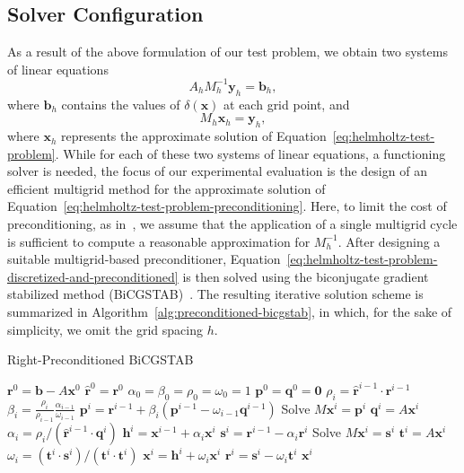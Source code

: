 \subsection{Solver Configuration}
\label{sec:solver-configuration-helmholtz}
As a result of the above formulation of our test problem, we obtain two systems of linear equations
\begin{equation}
	A_h M_h^{-1} \bm{y}_h = \bm{b}_h,
	\label{eq:helmholtz-test-problem-discretized-and-preconditioned}
\end{equation}
where $\bm{b}_h$ contains the values of $\delta(\bm{x})$ at each grid point, and
\begin{equation}
	M_h \bm{x}_h = \bm{y}_h,
	\label{eq:helmholtz-test-problem-preconditioning}
\end{equation}
where $\bm{x}_h$ represents the approximate solution of Equation~\eqref{eq:helmholtz-test-problem}.
While for each of these two systems of linear equations, a functioning solver is needed, the focus of our experimental evaluation is the design of an efficient multigrid method for the approximate solution of Equation~\eqref{eq:helmholtz-test-problem-preconditioning}.
Here, to limit the cost of preconditioning, as in~\cite{erlangga2008advances}, we assume that the application of a single multigrid cycle is sufficient to compute a reasonable approximation for $M_{h}^{-1}$.
After designing a suitable multigrid-based preconditioner, Equation~\eqref{eq:helmholtz-test-problem-discretized-and-preconditioned} is then solved using the biconjugate gradient stabilized method (BiCGSTAB)~\cite{saad2003iterative}.
The resulting iterative solution scheme is summarized in Algorithm~\ref{alg:preconditioned-bicgstab}, in which, for the sake of simplicity, we omit the grid spacing $h$.
\begin{algorithm}[t]
	\caption{Right-Preconditioned BiCGSTAB}
	\label{alg:preconditioned-bicgstab}
	\begin{algorithmic}[1] %
			\State $\bm{r}^0 = \bm{b} - A \bm{x}^0$
			\State $\bm{\hat{r}}^0 = \bm{r}^0$
			\State $\alpha_0 = \beta_0 = \rho_0 = \omega_0 = 1$
			\State $\bm{p}^0 = \bm{q}^0 = \bm{0}$
			\State $\rho_i = \bm{\hat{r}}^{i-1} \cdot \bm{r}^{i-1}$
			\State $\beta_i = \frac{\rho_i }{\rho_{i-1} }\frac{\alpha_{i-1}}{ \omega_{i-1}}$
			\State $\bm{p}^i = \bm{r}^{i-1} + \beta_i (\bm{p}^{i-1} - \omega_{i-1} \bm{q}^{i-1})$
			\State Solve $M \bm{x}^i = \bm{p}^i$
			\State $\bm{q}^i = A \bm{x}^i$
			\State $\alpha_i = \rho_i / (\bm{\hat{r}}^{i-1} \cdot \bm{q}^i)$
			\State $\bm{h}^i = \bm{x}^{i-1} + \alpha_i \bm{x}^i$	
			\State $\bm{s}^i = \bm{r}^{i-1} - \alpha_i \bm{r}^i$
			\State Solve $M \bm{x}^i = \bm{s}^i$
			\State $\bm{t}^i = A \bm{x}^i$
			\State $\omega_i = (\bm{t}^i \cdot \bm{s}^i) / (\bm{t}^i \cdot \bm{t}^i)$
			\State $\bm{x}^i = \bm{h}^i + \omega_i \bm{x}^i$
			\State $\bm{r}^i = \bm{s}^i - \omega_i \bm{t}^i$
			\Return $\bm{x}^i$
			\EndIf
			\EndFor
		\end{algorithmic}
\end{algorithm}
